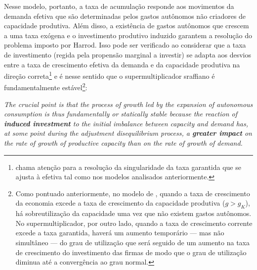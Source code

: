 Nesse modelo, portanto, a taxa de acumulação responde aos movimentos da demanda efetiva que são determinadas pelos gastos autônomos não criadores de capacidade produtiva. Além disso, a existência de gastos autônomos que crescem a uma taxa exógena e o investimento produtivo induzido garantem a resolução do problema imposto por Harrod. Isso pode ser verificado ao considerar que a taxa de investimento (regida pela propensão marginal a investir) se adapta aos desvios entre a taxa de crescimento efetiva da demanda e da capacidade produtiva na direção correta\footnote{\textcite{cesaratto_neo-kaleckian_2015} chama atenção para a resolução da singularidade da taxa garantida que se ajusta à efetiva tal como nos modelos analisados anteriormente.} e é nesse sentido que o supermultiplicador sraffiano é fundamentalmente estável\footnote{
	Como pontuado anteriormente, no modelo de \textcite{harrod_essay_1939}, quando a taxa de crescimento da economia excede a taxa de crescimento da capacidade produtiva ($g > g_K$), há sobreutilização da capacidade uma vez que não existem gastos autônomos. 
	No supermultiplicador, por outro lado, quando a taxa de crescimento corrente excede a taxa garantida, haverá 
	um aumento temporário --- mas não simultâneo --- do grau de utilização que será seguido de um aumento na taxa de crescimento do investimento das firmas de modo que o grau de utilização diminua até a convergência ao grau normal.}:

\begin{citacao}
	\textit{The crucial point is that the process of growth led by the expansion of autonomous consumption is thus fundamentally or statically stable because the reaction of \textbf{induced investment} to the initial imbalance between capacity and demand has, at some point during the adjustment disequilibrium process, a \textbf{greater impact} on the rate of growth of productive capacity than on the rate of growth of demand.} \cite[p.~19, grifos adicionados]{serrano_trouble_2017}
\end{citacao}

